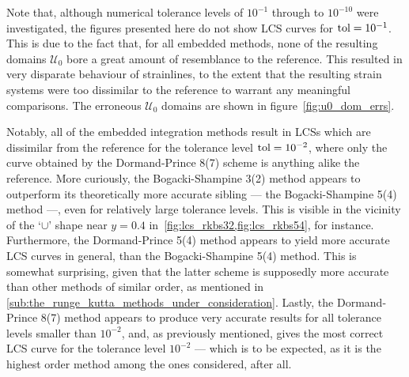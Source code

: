 Note that, although numerical tolerance levels of $10^{-1}$ through to
$10^{-10}$ were investigated, the figures presented here do not show LCS curves
for $\textnormal{tol}=10^{-1}$. This is due to the fact that, for all
embedded methods, none of the resulting domains $\mathcal{U}_{0}$ bore
a great amount of resemblance to the reference. This resulted in very disparate
behaviour of strainlines, to the extent that the resulting strain systems were
too dissimilar to the reference to warrant any meaningful comparisons. The
erroneous $\mathcal{U}_{0}$ domains are shown in figure~\ref{fig:u0_dom_errs}.

Notably, all of the embedded integration methods result in LCSs which are
dissimilar from the reference for the tolerance level $\textnormal{tol}=10^{-2}$,
where only the curve obtained by the Dormand-Prince 8(7) scheme is anything
alike the reference. More curiously, the Bogacki-Shampine 3(2) method appears
to outperform its theoretically more accurate sibling --- the
Bogacki-Shampine 5(4) method ---, even for relatively
large tolerance levels. This is visible in the
vicinity of the `$\cup$' shape near $y=0.4$ in~\cref{fig:lcs_rkbs32,fig:lcs_rkbs54},
for instance. Furthermore, the Dormand-Prince 5(4) method appears to yield more
accurate LCS curves in general, than the Bogacki-Shampine 5(4) method. This
is somewhat surprising, given that the latter scheme is supposedly more accurate
than other methods of similar order, as mentioned in
\cref{sub:the_runge_kutta_methods_under_consideration}. Lastly, the
Dormand-Prince 8(7) method appears to produce very accurate results for all
tolerance levels smaller than $10^{-2}$, and, as previously mentioned, gives
the most correct LCS curve for the tolerance level $10^{-2}$
--- which is to be expected, as it is the highest order method among the ones
considered, after all.
\vspace{\fill}










